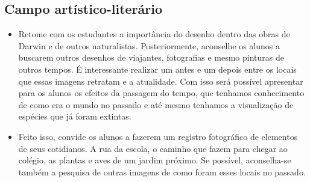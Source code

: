 \documentclass[11pt]{extarticle}
\begin{document}
\subsection{Campo artístico-literário }

\begin{comment}
``No campo artístico-literário busca-se a ampliação do contato e a análise mais
fundamentada de manifestações culturais e artísticas em geral. Está em jogo
a continuidade da formação do leitor literário e do desenvolvimento da fruição.
A análise contextualizada de produções artísticas e dos textos literários, com
destaque para os clássicos, intensifica-se no Ensino Médio. Gêneros e formas
diversas de produções vinculadas à apreciação de obras artísticas e produções
culturais (resenhas, vlogs e podcasts literários, culturais etc.) ou a formas
de apropriação do texto literário, de produções cinematográficas e teatrais
e de outras manifestações artísticas (remidiações, paródias, estilizações,
videominutos, fanfics etc.) continuam a ser considerados associados
a habilidades técnicas e estéticas mais refinadas.

A escrita literária, por sua vez, ainda que não seja o foco central do
componente de Língua Portuguesa, também se mostra rica em possibilidades
expressivas.'' (BNCC, p. 495-496)
\end{comment}

\begin{itemize} \item Retome com os estudantes a importância do desenho dentro
      das obras de Darwin e de outros naturalistas. Posteriormente, aconselhe
      os alunos a buscarem outros desenhos de viajantes, fotografias e mesmo
      pinturas de outros tempos. É interessante realizar um antes e um depois
      entre os locais que essas imagens retratam e a atualidade. Com isso será
      possível apresentar para os alunos os efeitos da passagem do tempo,
      que tenhamos conhecimento de como era o mundo no passado
      e até mesmo tenhamos a visualização de espécies que já foram
      extintas. 

      \item Feito isso, convide os alunos a fazerem um registro fotográfico
      de elementos de seus cotidianos. A rua da escola, o caminho que fazem
      para chegar ao colégio, as plantas e aves de um jardim próximo. Se
  possível, aconselha-se também a pesquisa de outras imagens de como foram
  esses locais no passado.  \end{itemize}
\end{document}
